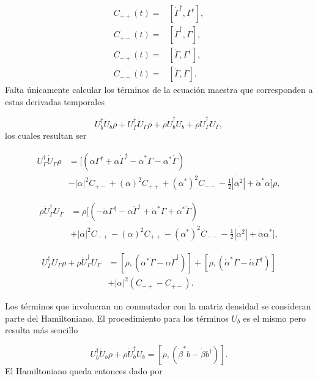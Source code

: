 \documentclass[10pt,a4paper]{report}
\begin{document}
\begin{align*}
C_{++}(t) =& [\dot{\Gamma}^{\dagger}, \Gamma^{\dagger}],\\
C_{+-}(t) =& [\dot{\Gamma}^{\dagger}, \Gamma],\\
C_{-+}(t) =& [\dot{\Gamma}, \Gamma^{\dagger}],\\
C_{--}(t) =& [\dot{\Gamma}, \Gamma].
\end{align*} Falta únicamente calcular los términos de la ecuación maestra que corresponden a estas derivadas temporales

\begin{equation}
U_b^\dagger \dot{U}_b \rho + U_\Gamma^\dagger \dot{U}_\Gamma \rho + \rho \dot{U}_b^\dagger U_b+ \rho \dot{U}_\Gamma^\dagger U_\Gamma,
\end{equation} los cuales resultan ser

\begin{align}
U_\Gamma^\dagger \dot{U}_\Gamma \rho &= [(\dot{\alpha}\Gamma^\dagger + \alpha \dot{\Gamma}^\dagger - \dot{\alpha}^*\Gamma -\alpha^*\dot{\Gamma} ) \\
 &- |\alpha|^2C_{+-} + (\alpha)^2C_{++} + (\alpha^*)^2 C_{--} - \frac{1}{2}\dot{|\alpha^2|} + \dot{\alpha}^*\alpha]\rho \nonumber,
\end{align}

\begin{align}
 \rho \dot{U}_\Gamma^\dagger U_\Gamma &= \rho[(-\dot{\alpha}\Gamma^\dagger - \alpha \dot{\Gamma}^\dagger + \dot{\alpha}^*\Gamma +\alpha^*\dot{\Gamma} ) \\
 &+ |\alpha|^2C_{-+} - (\alpha)^2C_{++} - (\alpha^*)^2 C_{--} - \frac{1}{2}\dot{|\alpha^2|} + \dot{\alpha}\alpha^*], \nonumber
\end{align}

\begin{align}
U_\Gamma^\dagger \dot{U}_\Gamma \rho + \rho \dot{U}_\Gamma^\dagger U_\Gamma &= [\rho, (\alpha^*\dot{\Gamma} - \alpha\dot{\Gamma}^\dagger)] + [\rho, (\dot{\alpha}^*\Gamma - \dot{\alpha}\Gamma^\dagger)] \\
&+|\alpha|^2 (C_{-+} - C_{+-}).
\end{align} 

Los términos que involucran un conmutador con la matriz densidad se consideran parte del Hamiltoniano. El procedimiento para los términos  $U_b$ es el mismo pero resulta más sencillo

\begin{equation}
U_b^\dagger \dot{U}_b \rho+ \rho \dot{U}_b^\dagger U_b = [\rho, (\dot{\beta}^*b - \dot{\beta}b^\dagger)].
\end{equation} El Hamiltoniano queda entonces dado por
\end{document}
